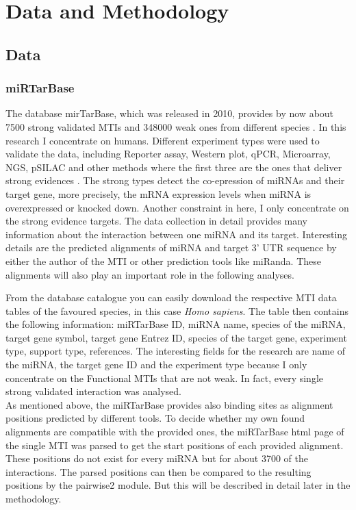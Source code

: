 \documentclass[12pt]{article}
\begin{document}
\vspace{2cm}


\section{Data and Methodology}

 
\subsection{Data} 
\subsubsection{miRTarBase}
The database mirTarBase, which was released in 2010, provides by now about 7500 strong validated MTIs and 348000 weak ones from different species \cite{Chou}. In this research I concentrate on humans. Different experiment types were used to validate the data, including Reporter assay, Western plot, qPCR, Microarray, NGS, pSILAC and other methods where the first three are the ones that deliver strong evidences \cite{Hsu}. The strong types detect the co-epression of miRNAs and their target gene, more precisely, the mRNA expression levels when miRNA is overexpressed or knocked down. Another constraint in here, I only concentrate on the strong evidence targets. The data collection in detail provides many information about the interaction between one miRNA and its target. Interesting details are the predicted alignments of miRNA and target 3' UTR sequence by either the author of the MTI or other prediction tools like miRanda. These alignments will also play an important role in the following analyses. 

From the database catalogue you can easily download the respective MTI data tables of the favoured species, in this case \textit{Homo sapiens}. The table then contains the following information: miRTarBase ID, miRNA name, species of the miRNA, target gene symbol, target gene Entrez ID, species of the target gene, experiment type, support type, references. The interesting fields for the research are name of the miRNA, the target gene ID and the experiment type because I only concentrate on the Functional MTIs that are not weak. In fact, every single strong validated interaction was analysed.\\

As mentioned above, the miRTarBase provides also binding sites as alignment positions predicted by different tools. To decide whether my own found alignments are compatible with the provided ones, the miRTarBase html page of the single MTI was parsed to get the start positions of each provided alignment. These positions do not exist for every miRNA but for about 3700 of the interactions. The parsed positions can then be compared to the resulting positions by the pairwise2 module. But this will be described in detail later in the methodology. 
\end{document}

